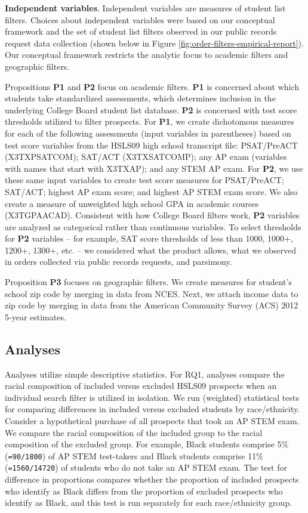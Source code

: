 \documentclass[
  12pt,
]{article}
\begin{document}
\textbf{Independent variables}. Independent variables are measures of student list filters. Choices about independent variables were based on our conceptual framework and the set of student list filters observed in our public records request data collection (shown below in Figure \ref{fig:order-filters-empirical-report}). Our conceptual framework restricts the analytic focus to academic filters and geographic filters.

Propositions \textbf{P1} and \textbf{P2} focus on academic filters. \textbf{P1} is concerned about which students take standardized assessments, which determines inclusion in the underlying College Board student list database. \textbf{P2} is concerned with test score thresholds utilized to filter prospects. For \textbf{P1}, we create dichotomous measures for each of the following assessments (input variables in parentheses) based on test score variables from the HSLS09 high school transcript file: PSAT/PreACT (X3TXPSATCOM); SAT/ACT (X3TXSATCOMP); any AP exam (variables with names that start with X3TXAP); and any STEM AP exam. For \textbf{P2}, we use these same input variables to create test score measures for PSAT/PreACT; SAT/ACT; highest AP exam score; and highest AP STEM exam score. We also create a measure of unweighted high school GPA in academic courses (X3TGPAACAD). Consistent with how College Board filters work, \textbf{P2} variables are analyzed as categorical rather than continuous variables. To select thresholds for \textbf{P2} variables -- for example, SAT score thresholds of less than 1000, 1000+, 1200+, 1300+, etc. -- we considered what the product allows, what we observed in orders collected via public records requests, and parsimony.

Proposition \textbf{P3} focuses on geographic filters. We create measures for student's school zip code by merging in data from NCES. Next, we attach income data to zip code by merging in data from the American Community Survey (ACS) 2012 5-year estimates.

\hypertarget{analyses}{%
\subsection{Analyses}\label{analyses}}

Analyses utilize simple descriptive statistics. For RQ1, analyses compare the racial composition of included versus excluded HSLS09 prospects when an individual search filter is utilized in isolation. We run (weighted) statistical tests for comparing differences in included versus excluded students by race/ethnicity. Consider a hypothetical purchase of all prospects that took an AP STEM exam. We compare the racial composition of the included group to the racial composition of the excluded group. For example, Black students comprise 5\% (\texttt{=90/1800}) of AP STEM test-takers and Black students comprise 11\% (\texttt{=1560/14720}) of students who do not take an AP STEM exam. The test for difference in proportions compares whether the proportion of included prospects who identify as Black differs from the proportion of excluded prospects who identify as Black, and this test is run separately for each race/ethnicity group.
\end{document}
